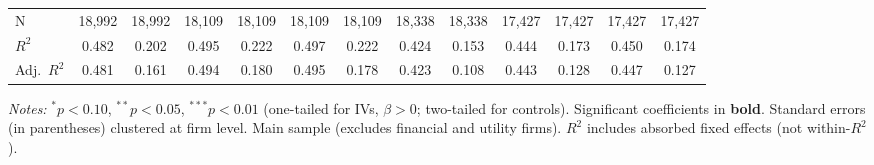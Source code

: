 \documentclass[11pt,a4paper]{article}
\begin{document}
\begin{table}[htbp]
\begin{tabular}{lcccccccccccc}
\midrule
N & 18,992 & 18,992 & 18,109 & 18,109 & 18,109 & 18,109 & 18,338 & 18,338 & 17,427 & 17,427 & 17,427 & 17,427 \\
$R^2$ & 0.482 & 0.202 & 0.495 & 0.222 & 0.497 & 0.222 & 0.424 & 0.153 & 0.444 & 0.173 & 0.450 & 0.174 \\
Adj.~$R^2$ & 0.481 & 0.161 & 0.494 & 0.180 & 0.495 & 0.178 & 0.423 & 0.108 & 0.443 & 0.128 & 0.447 & 0.127 \\
\bottomrule
\end{tabular}
\begin{minipage}{\linewidth}
\vspace{2pt}\scriptsize
\textit{Notes:} $^{*}p<0.10$, $^{**}p<0.05$, $^{***}p<0.01$ (one-tailed for IVs, $\beta > 0$; two-tailed for controls).
 Significant coefficients in \textbf{bold}.
 Standard errors (in parentheses) clustered at firm level.
 Main sample (excludes financial and utility firms).
 $R^2$ includes absorbed fixed effects (not within-$R^2$).
\end{minipage}
\end{table}
\clearpage
\end{document}

